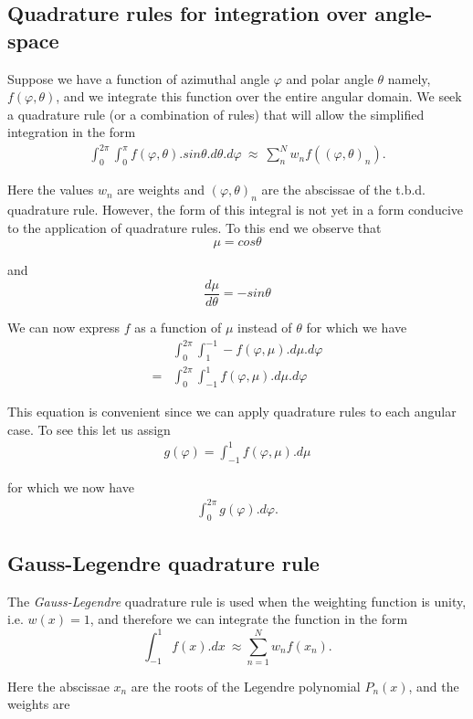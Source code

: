 \documentclass[11pt,letterpaper,titlepage]{article}
\renewcommand{\thefigure}{\arabic{section}.\arabic{figure}}
\newcommand{\beq}{\begin{equation*}
\begin{aligned}}
\newcommand{\eeq}{\end{aligned}
\end{equation*}}
\newcommand{\beqn}{\begin{equation}
	\begin{aligned}}
\newcommand{\eeqn}{\end{aligned}
	\end{equation}}
\numberwithin{equation}{section}
\begin{document}
\newpage
\renewcommand{\thefigure}{A\arabic{section}.\arabic{figure}}
\begin{appendices}
\vspace{1cm}
\section{Quadrature rules for integration over angle-space}

Suppose we have a function of azimuthal angle $\varphi$ and polar angle $\theta$ namely, $f(\varphi,\theta)$, and we integrate this function over the entire angular domain. We seek a quadrature rule (or a combination of rules) that will allow the simplified integration in the form
\beq
\int_0^{2\pi}\int_0^\pi f(\varphi,\theta).sin\theta.d\theta.d\varphi\ 
\approx \  \sum_{n}^N w_n f((\varphi,\theta)_n).
\eeq 

Here the values $w_n$ are weights and $(\varphi,\theta)_n$ are the abscissae of the t.b.d. quadrature rule. However, the form of this integral is not yet in a form conducive to the application of quadrature rules. To this end we observe that 
$$
\mu = cos \theta
$$

and 
$$
\frac{d\mu}{d\theta} = -sin\theta
$$

We can now express $f$ as a function of $\mu$ instead of $\theta$ for which we have
\beq
&\int_0^{2\pi} \int_{1}^{-1}  -f(\varphi,\mu).d\mu.d\varphi \\
=&\int_0^{2\pi} \int_{-1}^{1}  f(\varphi,\mu).d\mu.d\varphi 
\eeq 

This equation is convenient since we can apply quadrature rules to each angular case. To see this let us assign 
\beqn
g(\varphi) = \int_{-1}^1  f(\varphi,\mu).d\mu
\eeqn

for which we now have 
\beqn\label{eq:integratevarphi}
\int_0^{2\pi} g(\varphi).d\varphi.
\eeqn

\vspace{1cm}
\subsection{Gauss-Legendre quadrature rule}
The \textit{Gauss-Legendre} quadrature rule is used when the weighting function is unity, i.e. $w(x){=}1$, and therefore we can integrate the function in the form
$$
\int_{-1}^1 f(x).dx \ \approx \sum_{n=1}^N w_n f(x_n).
$$

Here the abscissae $x_n$ are the roots of the Legendre polynomial $P_n(x)$, and the weights are


\end{appendices}
\end{document}
